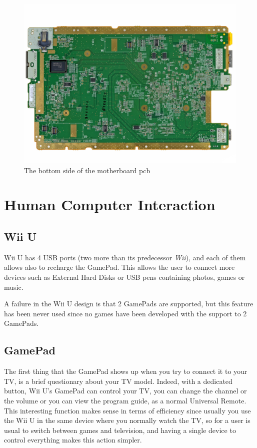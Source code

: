 \documentclass[11pt,a4paper,titlepage]{article}
\begin{document}
				\begin{figure}[htbp]
				  \centering
				  \includegraphics[width = .8\textwidth]{motherboard_back.png}
				  \caption{The bottom side of the motherboard \gls{pcb}}
				  \label{fig:motherboard_bottom}
				\end{figure}

	\section{Human Computer Interaction}
		\subsection{Wii U}
			Wii U has 4 USB ports (two more than its predecessor \textit{Wii}), and each of them allows also to recharge the GamePad. This allows the user to connect more devices such as External Hard Disks or USB pens containing photos, games or music.

			A failure in the Wii U design is that 2 GamePads are supported, but this feature has been never used since no games have been developed with the support to 2 GamePads.
		\subsection{GamePad}
			The first thing that the GamePad shows up when you try to connect it to your TV, is a brief questionary about your TV model.
			Indeed, with a dedicated button, Wii U's GamePad can control your TV, you can change the channel or the volume or you can view the program guide, as a normal Universal Remote.
			This interesting function makes sense in terms of efficiency since usually you use the Wii U in the same device where you normally watch the TV, so for a user is usual to switch between games and television, and having a single device to control everything makes this action simpler.
\end{document}
